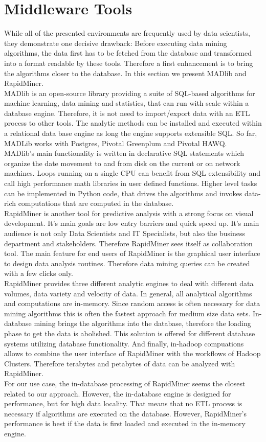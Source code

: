\section{Middleware Tools}
While all of the presented environments are frequently used by data scientists, they demonstrate one decisive drawback: Before executing data mining algorithms, the data first has to be fetched from the database and transformed into a format readable by these tools. Therefore a first enhancement is to bring the algorithms closer to the database. In this section we present MADlib and RapidMiner.
\\
MADlib is an open-source library providing a suite of SQL-based algorithms for machine learning, data mining and statistics, that can run with scale within a database engine. Therefore, it is not need to import/export data with an ETL process to other tools. The analytic methods can be installed and executed within a relational data base engine as long the engine supports extensible SQL. So far, MADLib works with Postgres, Pivotal Greenplum and Pivotal HAWQ.
\\
MADlib's main functionality is written in declarative SQL statements which organize the date movement to and from disk on the current or on network machines. Loops running on a single CPU can benefit from SQL extensibility and call high performance math libraries in user defined functions. Higher level tasks can be implemented in Python code, that drives the algorithms and invokes data-rich computations that are computed in the database.
\\
RapidMiner is another tool for predictive analysis with a strong focus on visual development. It's main goals are low entry barriers and quick speed up. It's main audience is not only Data Scientists and IT Specialists, but also the business department and stakeholders. Therefore RapidMiner sees itself as collaboration tool. The main feature for end users of RapidMiner is the graphical user interface to  design data analysis routines. Therefore data mining queries can be created with a few clicks only.
\\
RapidMiner provides three different analytic engines to deal with different data volumes, data variety and velocity of data. In general, all analytical algorithms and computations are in-memory. Since random access is often necessary for data mining algorithms this is often the fastest approach for medium size data sets. In-database mining brings the algorithms into the database, therefore the loading phase to get the data is abolished. This solution is offered for different database systems utilizing database functionality. And finally, in-hadoop compuations allows to combine the user interface of RapidMiner with the workflows of Hadoop Clusters. Therefore terabytes and petabytes of data can be analyzed with RapidMiner.
\\ 
For our use case, the in-database processing of RapidMiner seems the closest related to our approach. However, the in-database engine is designed for performance, but for high data locality. That means that no ETL process is necessary if algorithms are executed on the database. However, RapidMiner's performance is best if the data is first loaded and executed in the in-memory engine.


